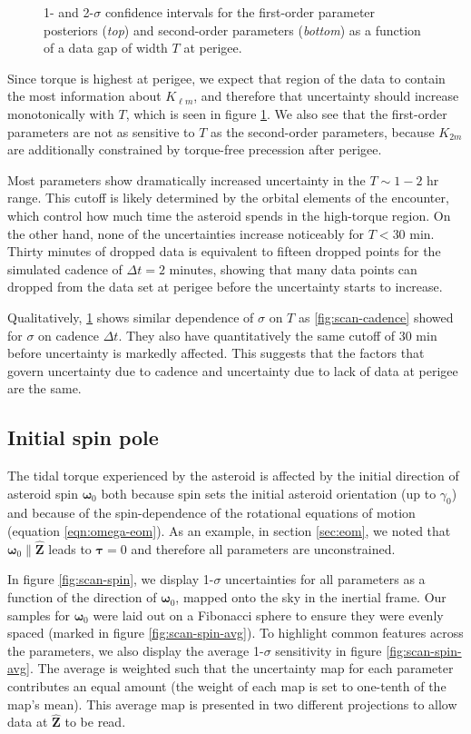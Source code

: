 \documentclass[fleqn,usenatbib]{mnras}
\newcommand{\unit}[1]{\bm{\hat{#1}}}
\begin{document}
\begin{figure}
  \caption{1- and 2-$\sigma$ confidence intervals for the first-order parameter posteriors (\textit{top}) and second-order parameters (\textit{bottom}) as a function of a data gap of width $T$ at perigee.}
  \label{fig:observation-gap}
\end{figure}

Since torque is highest at perigee, we expect that region of the data to contain the most information about $K_{\ell m}$, and therefore that uncertainty should increase monotonically with $T$, which is seen in figure \ref{fig:observation-gap}. We also see that the first-order parameters are not as sensitive to $T$ as the second-order parameters, because $K_{2m}$ are additionally constrained by torque-free precession after perigee.

Most parameters show dramatically increased uncertainty in the $T \sim 1-2$ hr range. This cutoff is likely determined by the orbital elements of the encounter, which control how much time the asteroid spends in the high-torque region. On the other hand, none of the uncertainties increase noticeably for $T < 30$ min. Thirty minutes of dropped data is equivalent to fifteen dropped points for the simulated cadence of $\Delta t = 2$ minutes, showing that many data points can dropped from the data set at perigee before the uncertainty starts to increase.

Qualitatively, \ref{fig:observation-gap} shows similar dependence of $\sigma$ on $T$ as \ref{fig:scan-cadence} showed for $\sigma$ on cadence $\Delta t$. They also have quantitatively the same cutoff of 30 min before uncertainty is markedly affected. This suggests that the factors that govern uncertainty due to cadence and uncertainty due to lack of data at perigee are the same.


\subsection{Initial spin pole}
\label{sec:scan-spin}

The tidal torque experienced by the asteroid is affected by the initial direction of asteroid spin $\bm \omega_0$ both because spin sets the initial asteroid orientation (up to $\gamma_0$) and because of the spin-dependence of the rotational equations of motion (equation \ref{eqn:omega-eom}). As an example, in section \ref{sec:eom}, we noted that $\bm \omega_0 \parallel \unit Z$ leads to $\bm \tau = 0$ and therefore all parameters are unconstrained.

In figure \ref{fig:scan-spin}, we display 1-$\sigma$ uncertainties for all parameters as a function of the direction of $\bm \omega_0$, mapped onto the sky in the inertial frame. Our samples for $\bm \omega_0$ were laid out on a Fibonacci sphere to ensure they were evenly spaced (marked in figure \ref{fig:scan-spin-avg}). To highlight common features across the parameters, we also display the average 1-$\sigma$ sensitivity in figure \ref{fig:scan-spin-avg}. The average is weighted such that the uncertainty map for each parameter contributes an equal amount
(the weight of each map is set to one-tenth of the map's mean). This average map is presented in two different projections to allow data at $\unit Z$ to be read.
\end{document}

